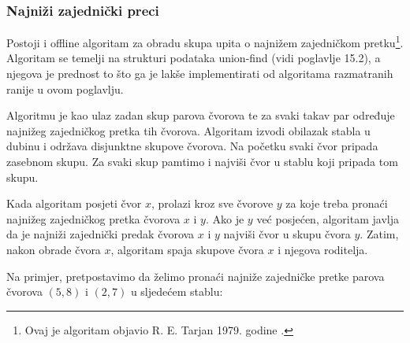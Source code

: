 \subsubsection{Najniži zajednički preci}

Postoji i offline algoritam
za obradu skupa
upita o najnižem zajedničkom pretku\footnote{Ovaj je
algoritam objavio R. E. Tarjan 1979. godine \cite{tar79}.}.
Algoritam se temelji na strukturi podataka union-find
(vidi poglavlje 15.2), a njegova je prednost
to što ga je lakše implementirati od
algoritama razmatranih ranije u ovom poglavlju.

Algoritmu je kao ulaz zadan skup parova čvorova
te za svaki takav par određuje
najnižeg zajedničkog pretka tih čvorova.
Algoritam izvodi obilazak stabla u dubinu
i održava disjunktne skupove čvorova.
Na početku svaki čvor pripada zasebnom skupu.
Za svaki skup pamtimo i najviši čvor u
stablu koji pripada tom skupu.

Kada algoritam posjeti čvor $x$,
prolazi kroz sve čvorove $y$ za koje
treba pronaći najnižeg zajedničkog pretka
čvorova $x$ i $y$.
Ako je $y$ već posjećen,
algoritam javlja da je 
najniži zajednički predak čvorova $x$ i $y$
najviši čvor u skupu čvora $y$.
Zatim, nakon obrade čvora $x$,
algoritam spaja skupove čvora $x$ i njegova roditelja.

Na primjer, pretpostavimo da želimo pronaći najniže
zajedničke pretke parova čvorova $(5,8)$
i $(2,7)$ u sljedećem stablu:
\begin{center}
\end{center}

